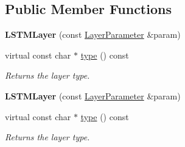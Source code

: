 \subsection*{Public Member Functions}
\begin{DoxyCompactItemize}
\item 
\mbox{\label{classcaffe_1_1_l_s_t_m_layer_abcf1a46aef1f25b7a78d13dc7e34f13b}} 
{\bfseries L\+S\+T\+M\+Layer} (const \mbox{\hyperlink{classcaffe_1_1_layer_parameter}{Layer\+Parameter}} \&param)
\item 
\mbox{\label{classcaffe_1_1_l_s_t_m_layer_a971791d82dee1ec9cdd0625ee1579e22}} 
virtual const char $\ast$ \mbox{\hyperlink{classcaffe_1_1_l_s_t_m_layer_a971791d82dee1ec9cdd0625ee1579e22}{type}} () const
\begin{DoxyCompactList}\small\item\em Returns the layer type. \end{DoxyCompactList}\item 
\mbox{\label{classcaffe_1_1_l_s_t_m_layer_abcf1a46aef1f25b7a78d13dc7e34f13b}} 
{\bfseries L\+S\+T\+M\+Layer} (const \mbox{\hyperlink{classcaffe_1_1_layer_parameter}{Layer\+Parameter}} \&param)
\item 
\mbox{\label{classcaffe_1_1_l_s_t_m_layer_a971791d82dee1ec9cdd0625ee1579e22}} 
virtual const char $\ast$ \mbox{\hyperlink{classcaffe_1_1_l_s_t_m_layer_a971791d82dee1ec9cdd0625ee1579e22}{type}} () const
\begin{DoxyCompactList}\small\item\em Returns the layer type. \end{DoxyCompactList}\end{DoxyCompactItemize}
